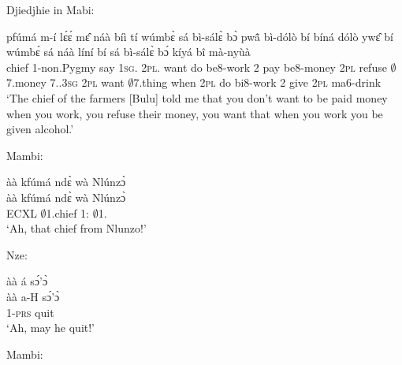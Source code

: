 \noindent Djiedjhie in Mabi:

\begin{exe}[(C234)] 
\exC\label{231}  
  \gll pfúmá m-í lɛ́ɛ́ mɛ̂ náà bíì tí wúmbɛ̀ sá bì-sálɛ̀ bɔ̀ pwã̂ bì-dólò bí bíná dólò ywɛ̂ bí wúmbɛ́ sá náà líní bí sá bì-sálɛ̀ bɔ́ kíyá bî mà-nyùà  \\
        chief {\N}1-non.Pygmy say 1\textsc{sg}.{\SBJ}  {\COMP} 2\textsc{pl}.{\SBJ}  {\NEG} want do be8-work 2 pay be8-money 2\textsc{pl} refuse $\emptyset$7.money 7.{\POSS}.3\textsc{sg} 2\textsc{pl} want $\emptyset$7.thing {\COMP} when 2\textsc{pl} do bi8-work 2 give 2\textsc{pl} ma6-drink \\
    \trans `The chief of the farmers [Bulu] told me that you don't want to be paid money when you work, you refuse their money, you want that when you work you be given alcohol.'
\end{exe}

\noindent Mambi:

\begin{exe}[(C234)]  
\exC\label{232}  
  \glll  àà kfúmá ndɛ̀ wà Nlúnzɔ̀ \\
        àà kfúmá ndɛ̀ wà Nlúnzɔ̀ \\
        ECXL $\emptyset$1.chief {\ANA}  1:{\ATT}  $\emptyset$1.{\PN}  \\
    \trans `Ah, that chief from Nlunzo!'
\end{exe}

\noindent Nze:

\begin{exe}[(C234)] 
\exC\label{233}
  \glll àà  á sɔ́'ɔ̀ \\
       àà  a-H sɔ́'ɔ̀ \\
         {\EXCL} 1-\textsc{prs} quit  \\
    \trans `Ah, may he quit!'
\end{exe}

\noindent Mambi:

